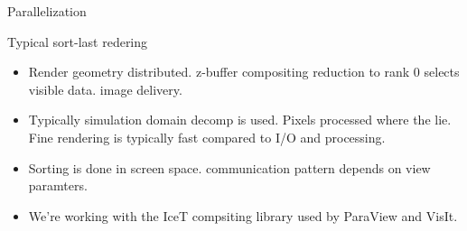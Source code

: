 \documentclass[notes]{beamer}
\begin{document}
\begin{frame}{Parallelization}

  \begin{beamerboxesrounded}{Typical sort-last redering}
      \begin{center}
      \hspace{0.1in}
      \end{center}
      \vspace{-0.15in}
      \begin{itemize}
      \scriptsize
      \item Render geometry distributed. z-buffer compositing reduction to rank 0 selects visible data. image delivery.
      \item Typically simulation domain decomp is used. Pixels processed where the lie. Fine rendering is typically fast compared to I/O and processing.
      \item Sorting is done in screen space. communication pattern depends on view paramters.
      \item We're working with the IceT compsiting library used by ParaView and VisIt.
      \end{itemize} 
  \end{beamerboxesrounded}
\end{frame}
\end{document}
